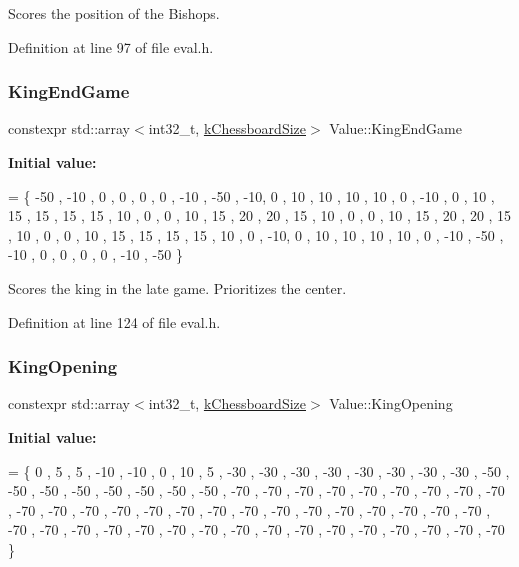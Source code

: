 Scores the position of the Bishops. 



Definition at line 97 of file eval.\+h.

\mbox{\label{namespaceValue_a581231b1446aff281ae15f755b875341}} 
\subsubsection{\texorpdfstring{King\+End\+Game}{KingEndGame}}
{\footnotesize\ttfamily constexpr std\+::array$<$int32\+\_\+t, \mbox{\hyperlink{constants_8h_a901d7bb0bf36a71e09079f9dd4168c4c}{k\+Chessboard\+Size}}$>$ Value\+::\+King\+End\+Game}

{\bfseries Initial value\+:}
\begin{DoxyCode}
= \{ 
        -50 ,   -10 ,   0   ,   0   ,   0   ,   0   ,   -10 ,   -50 ,
        -10,    0   ,   10  ,   10  ,   10  ,   10  ,   0   ,   -10 ,
        0   ,   10  ,   15  ,   15  ,   15  ,   15  ,   10  ,   0   ,
        0   ,   10  ,   15  ,   20  ,   20  ,   15  ,   10  ,   0   ,
        0   ,   10  ,   15  ,   20  ,   20  ,   15  ,   10  ,   0   ,
        0   ,   10  ,   15  ,   15  ,   15  ,   15  ,   10  ,   0   ,
        -10,    0   ,   10  ,   10  ,   10  ,   10  ,   0   ,   -10 ,
        -50 ,   -10 ,   0   ,   0   ,   0   ,   0   ,   -10 ,   -50 
    \}
\end{DoxyCode}


Scores the king in the late game. Prioritizes the center. 



Definition at line 124 of file eval.\+h.

\mbox{\label{namespaceValue_a0b4d4bb236eb7c18c48df42e6e3ca1fd}} 
\subsubsection{\texorpdfstring{King\+Opening}{KingOpening}}
{\footnotesize\ttfamily constexpr std\+::array$<$int32\+\_\+t, \mbox{\hyperlink{constants_8h_a901d7bb0bf36a71e09079f9dd4168c4c}{k\+Chessboard\+Size}}$>$ Value\+::\+King\+Opening}

{\bfseries Initial value\+:}
\begin{DoxyCode}
= \{ 
        0   ,   5   ,   5   ,   -10 ,   -10 ,   0   ,   10  ,   5   ,
        -30 ,   -30 ,   -30 ,   -30 ,   -30 ,   -30 ,   -30 ,   -30 ,
        -50 ,   -50 ,   -50 ,   -50 ,   -50 ,   -50 ,   -50 ,   -50 ,
        -70 ,   -70 ,   -70 ,   -70 ,   -70 ,   -70 ,   -70 ,   -70 ,
        -70 ,   -70 ,   -70 ,   -70 ,   -70 ,   -70 ,   -70 ,   -70 ,
        -70 ,   -70 ,   -70 ,   -70 ,   -70 ,   -70 ,   -70 ,   -70 ,
        -70 ,   -70 ,   -70 ,   -70 ,   -70 ,   -70 ,   -70 ,   -70 ,
        -70 ,   -70 ,   -70 ,   -70 ,   -70 ,   -70 ,   -70 ,   -70     
    \}
\end{DoxyCode}


